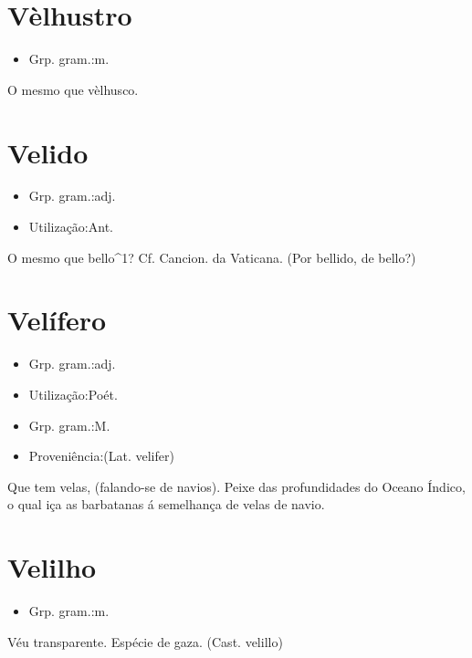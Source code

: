 \documentclass{article}
\begin{document}
\section{Vèlhustro}
\begin{itemize}
\item {Grp. gram.:m.}
\end{itemize}
O mesmo que \textunderscore vèlhusco\textunderscore .
\section{Velido}
\begin{itemize}
\item {Grp. gram.:adj.}
\end{itemize}
\begin{itemize}
\item {Utilização:Ant.}
\end{itemize}
O mesmo que \textunderscore bello\textunderscore ^1? Cf. \textunderscore Cancion. da Vaticana\textunderscore .
(Por \textunderscore bellido\textunderscore , de \textunderscore bello\textunderscore ?)
\section{Velífero}
\begin{itemize}
\item {Grp. gram.:adj.}
\end{itemize}
\begin{itemize}
\item {Utilização:Poét.}
\end{itemize}
\begin{itemize}
\item {Grp. gram.:M.}
\end{itemize}
\begin{itemize}
\item {Proveniência:(Lat. \textunderscore velifer\textunderscore )}
\end{itemize}
Que tem velas, (falando-se de navios).
Peixe das profundidades do Oceano Índico, o qual iça as barbatanas á semelhança de velas de navio.
\section{Velilho}
\begin{itemize}
\item {Grp. gram.:m.}
\end{itemize}
Véu transparente.
Espécie de gaza.
(Cast. \textunderscore velillo\textunderscore )
\end{document}
